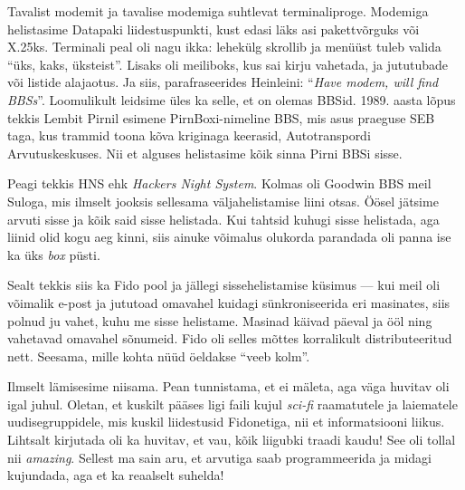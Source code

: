 Tavalist modemit ja tavalise modemiga suhtlevat terminaliproge. 
Modemiga helistasime Datapaki liidestuspunkti, kust edasi läks asi 
pakettvõrguks või X.25ks. Terminali peal oli nagu ikka: lehekülg skrollib ja menüüst tuleb valida 
\enquote{üks, kaks, üksteist}. Lisaks oli meiliboks, kus sai kirju vahetada, ja
jututubade või listide alajaotus. Ja siis, parafraseerides Heinleini: 
\enquote{\emph{Have modem, will find BBSs}}. 
Loomulikult leidsime üles ka selle, et on olemas BBSid. 1989. 
aasta lõpus tekkis Lembit Pirnil esimene 
PirnBoxi-nimeline BBS, mis asus praeguse SEB taga, kus trammid toona kõva kriginaga keerasid, 
Autotranspordi Arvutuskeskuses. Nii et 
alguses helistasime kõik sinna Pirni BBSi sisse. 

Peagi tekkis HNS ehk \emph{Hackers Night 
System}. Kolmas oli Goodwin BBS meil 
Suloga, mis ilmselt jooksis sellesama 
väljahelistamise liini otsas. Öösel jätsime arvuti sisse ja kõik said 
sisse helistada. Kui tahtsid kuhugi sisse helistada, aga liinid olid kogu aeg 
kinni, siis ainuke võimalus olukorda parandada oli panna ise ka üks
\emph{box} püsti. 

Sealt tekkis siis ka Fido pool ja jällegi sissehelistamise küsimus --- 
kui meil oli võimalik e-post ja jututoad omavahel 
kuidagi sünkroniseerida eri masinates, siis polnud ju vahet, kuhu me sisse 
helistame. Masinad käivad päeval ja ööl ning vahetavad omavahel 
sõnumeid. Fido oli selles mõttes korralikult distributeeritud nett. Seesama, 
mille kohta nüüd öeldakse \enquote{veeb kolm}. 


Ilmselt lämisesime niisama. Pean tunnistama, et ei mäleta, 
aga väga huvitav oli igal juhul. Oletan, et kuskilt
pääses ligi faili kujul \emph{sci-fi} raamatutele ja 
laiematele uudisegruppidele, mis kuskil liidestusid 
Fidonetiga, nii et informatsiooni liikus. Lihtsalt kirjutada
oli ka huvitav, et vau, kõik liigubki traadi kaudu! 
See oli tollal nii \emph{amazing}. Sellest ma sain aru, et arvutiga saab
programmeerida ja midagi kujundada, aga et ka reaalselt suhelda!

